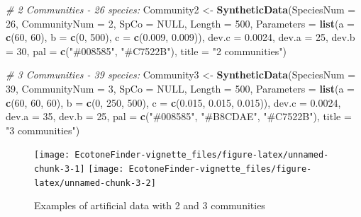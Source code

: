 \documentclass[
]{article}
\newenvironment{Shaded}{\begin{snugshade}}{\end{snugshade}}
\newcommand{\CommentTok}[1]{\textcolor[rgb]{0.56,0.35,0.01}{\textit{#1}}}
\newcommand{\DataTypeTok}[1]{\textcolor[rgb]{0.13,0.29,0.53}{#1}}
\newcommand{\DecValTok}[1]{\textcolor[rgb]{0.00,0.00,0.81}{#1}}
\newcommand{\FloatTok}[1]{\textcolor[rgb]{0.00,0.00,0.81}{#1}}
\newcommand{\KeywordTok}[1]{\textcolor[rgb]{0.13,0.29,0.53}{\textbf{#1}}}
\newcommand{\NormalTok}[1]{#1}
\newcommand{\OtherTok}[1]{\textcolor[rgb]{0.56,0.35,0.01}{#1}}
\newcommand{\StringTok}[1]{\textcolor[rgb]{0.31,0.60,0.02}{#1}}
\begin{document}
\begin{Shaded}
\begin{Highlighting}[]
\CommentTok{\# 2 Communities {-} 26 species:}
\NormalTok{Community2 \textless{}{-}}\StringTok{ }\KeywordTok{SyntheticData}\NormalTok{(}\DataTypeTok{SpeciesNum =} \DecValTok{26}\NormalTok{, }\DataTypeTok{CommunityNum =} \DecValTok{2}\NormalTok{, }\DataTypeTok{SpCo =} \OtherTok{NULL}\NormalTok{, }
    \DataTypeTok{Length =} \DecValTok{500}\NormalTok{, }\DataTypeTok{Parameters =} \KeywordTok{list}\NormalTok{(}\DataTypeTok{a =} \KeywordTok{c}\NormalTok{(}\DecValTok{60}\NormalTok{, }\DecValTok{60}\NormalTok{), }\DataTypeTok{b =} \KeywordTok{c}\NormalTok{(}\DecValTok{0}\NormalTok{, }\DecValTok{500}\NormalTok{), }\DataTypeTok{c =} \KeywordTok{c}\NormalTok{(}\FloatTok{0.009}\NormalTok{, }
        \FloatTok{0.009}\NormalTok{)), }\DataTypeTok{dev.c =} \FloatTok{0.0024}\NormalTok{, }\DataTypeTok{dev.a =} \DecValTok{25}\NormalTok{, }\DataTypeTok{dev.b =} \DecValTok{30}\NormalTok{, }\DataTypeTok{pal =} \KeywordTok{c}\NormalTok{(}\StringTok{"\#008585"}\NormalTok{, }
        \StringTok{"\#C7522B"}\NormalTok{), }\DataTypeTok{title =} \StringTok{"2 communities"}\NormalTok{)}

\CommentTok{\# 3 Communities {-} 39 species:}
\NormalTok{Community3 \textless{}{-}}\StringTok{ }\KeywordTok{SyntheticData}\NormalTok{(}\DataTypeTok{SpeciesNum =} \DecValTok{39}\NormalTok{, }\DataTypeTok{CommunityNum =} \DecValTok{3}\NormalTok{, }\DataTypeTok{SpCo =} \OtherTok{NULL}\NormalTok{, }
    \DataTypeTok{Length =} \DecValTok{500}\NormalTok{, }\DataTypeTok{Parameters =} \KeywordTok{list}\NormalTok{(}\DataTypeTok{a =} \KeywordTok{c}\NormalTok{(}\DecValTok{60}\NormalTok{, }\DecValTok{60}\NormalTok{, }\DecValTok{60}\NormalTok{), }\DataTypeTok{b =} \KeywordTok{c}\NormalTok{(}\DecValTok{0}\NormalTok{, }\DecValTok{250}\NormalTok{, }\DecValTok{500}\NormalTok{), }
        \DataTypeTok{c =} \KeywordTok{c}\NormalTok{(}\FloatTok{0.015}\NormalTok{, }\FloatTok{0.015}\NormalTok{, }\FloatTok{0.015}\NormalTok{)), }\DataTypeTok{dev.c =} \FloatTok{0.0024}\NormalTok{, }\DataTypeTok{dev.a =} \DecValTok{35}\NormalTok{, }\DataTypeTok{dev.b =} \DecValTok{25}\NormalTok{, }
    \DataTypeTok{pal =} \KeywordTok{c}\NormalTok{(}\StringTok{"\#008585"}\NormalTok{, }\StringTok{"\#B8CDAE"}\NormalTok{, }\StringTok{"\#C7522B"}\NormalTok{), }\DataTypeTok{title =} \StringTok{"3 communities"}\NormalTok{)}
\end{Highlighting}
\end{Shaded}

\begin{figure}
\texttt{[image: EcotoneFinder-vignette\_files/figure-latex/unnamed-chunk-3-1]} \texttt{[image: EcotoneFinder-vignette\_files/figure-latex/unnamed-chunk-3-2]} \caption{Examples of artificial data with 2 and 3 communities}\label{fig:unnamed-chunk-3}
\end{figure}
\end{document}

